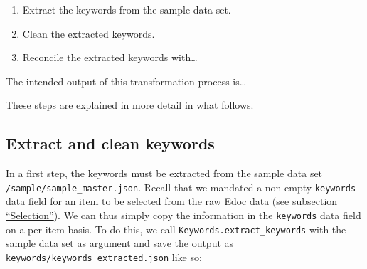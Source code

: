 \begin{enumerate}
\def\labelenumi{\arabic{enumi}.}
\tightlist
\item
  Extract the keywords from the sample data set.\\
\item
  Clean the extracted keywords.
\item
  Reconcile the extracted keywords with\ldots{}
\end{enumerate}

The intended output of this transformation process is\ldots{}

These steps are explained in more detail in what follows.

\hypertarget{extract-and-clean-keywords}{%
\subsection{Extract and clean
keywords}\label{extract-and-clean-keywords}}

In a first step, the keywords must be extracted from the sample data set
\texttt{/sample/sample\_master.json}. Recall that we mandated a
non-empty \texttt{keywords} data field for an item to be selected from
the raw Edoc data (see \protect\hyperlink{selection}{subsection
``Selection''}). We can thus simply copy the information in the
\texttt{keywords} data field on a per item basis. To do this, we call
\texttt{Keywords.extract\_keywords} with the sample data set as argument
and save the output as \texttt{keywords/keywords\_extracted.json} like
so:

\begin{Shaded}
\begin{Highlighting}[]
\OperatorTok{=}\OperatorTok{+} \NormalTok{)}
\OperatorTok{+} \NormalTok{)}
\end{Highlighting}
\end{Shaded}


